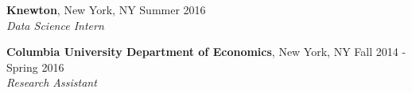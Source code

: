 \documentclass{res}
\begin{document}
\begin{resume}
\vspace{-2mm}  
\textbf{Knewton}, New York, NY \hfill{Summer 2016}\\
\textit{Data Science Intern}


  \vspace{-2mm}  
\textbf{Columbia University Department of Economics}, New York, NY \hfill Fall 2014 - Spring 2016\\
\textit{Research Assistant}



\end{resume}
\end{document}
